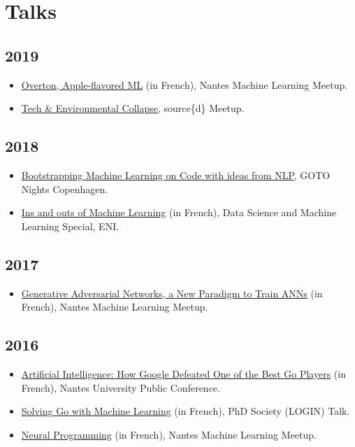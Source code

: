 \documentclass[11pt,a4paper,sans]{moderncv}        %
\begin{document}
\section{Talks}

\subsection{2019}

\begin{itemize}
\item
  \href{https://www.meetup.com/Nantes-Machine-Learning-Meetup/events/265265431/}{Overton,
    Apple-flavored ML} (in French), Nantes Machine Learning Meetup.
\item
  \href{https://www.eventbrite.com/e/tech-environmental-collapse-tickets-57986002695}{Tech
    \& Environmental Collapse}, source\{d\} Meetup.
\end{itemize}

\subsection{2018}

\begin{itemize}
\item
  \href{https://www.meetup.com/GOTO-Nights-CPH/events/256342503/}{Bootstrapping
    Machine Learning on Code with ideas from NLP}, GOTO Nights
  Copenhagen.
\item
  \href{https://www.mapado.com/nantes/la-matinale-de-la-data-science-et-du-machine-learning}{Ins
    and outs of Machine Learning} (in French), Data Science and
  Machine Learning Special, ENI.
\end{itemize}
\subsection{2017}

\begin{itemize}
\item
  \href{https://www.meetup.com/Nantes-Machine-Learning-Meetup/events/239481485/}{Generative
    Adversarial Networks, a New Paradigm to Train ANNs} (in French),
  Nantes Machine Learning Meetup.
\end{itemize}

\subsection{2016}

\begin{itemize}
\item \href{https://youtu.be/xv2S8A1EPqI}{Artificial Intelligence: How
    Google Defeated One of the Best Go Players} (in French), Nantes
  University Public Conference.
\item \href{https://youtu.be/KuvXb2nILLc}{Solving Go with Machine
    Learning} (in French), PhD Society (LOGIN) Talk.
\item
  \href{https://www.meetup.com/Nantes-Machine-Learning-Meetup/events/226648150/}{Neural
    Programming} (in French), Nantes Machine Learning Meetup.
\end{itemize}
\end{document}
